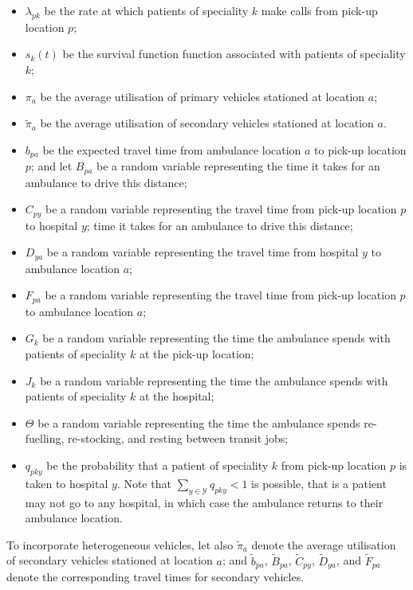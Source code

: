 \documentclass[preprint,12pt]{elsarticle}
\begin{document}
\begin{itemize}
  \item $\lambda_{pk}$ be the rate at which patients of speciality $k$ make
        calls from pick-up location $p$;
  \item $s_k(t)$ be the survival function function associated with patients of
        speciality $k$;
  \item $\pi_a$ be the average utilisation of primary vehicles stationed at
        location $a$;
  \item $\tilde{\pi}_a$ be the average utilisation of secondary vehicles
        stationed at location $a$.
  \item $b_{pa}$ be the expected travel time from ambulance location $a$ to
        pick-up location $p$; and let $B_{pa}$ be a random variable representing
        the time it takes for an ambulance to drive this distance;
  \item $C_{py}$ be a random variable representing the travel time from pick-up
        location $p$ to hospital $y$;
        time it takes for an ambulance to drive this distance;
  \item $D_{ya}$ be a random variable representing the travel time from hospital
        $y$ to ambulance location $a$;
  \item $F_{pa}$ be a random variable representing the travel time from pick-up
        location $p$ to ambulance location $a$;
  \item $G_k$ be a random variable representing the time the ambulance spends
        with patients of speciality $k$ at the pick-up location;
  \item $J_k$ be a random variable representing the time the ambulance spends
        with patients of speciality $k$ at the hospital;
  \item $\Theta$ be a random variable representing the time the ambulance spends
        re-fuelling, re-stocking, and resting between transit jobs;
  \item $q_{pky}$ be the probability that a patient of speciality $k$ from
        pick-up location $p$ is taken to hospital $y$.
        Note that $\sum_{y \in \mathcal{Y}} q_{pky} < 1$ is possible, that is a
        patient may not go to any hospital, in which case the ambulance returns
        to their ambulance location.
\end{itemize}

To incorporate heterogeneous vehicles, let also $\tilde{\pi}_a$ denote the
average utilisation of secondary vehicles stationed at location $a$; and
$\tilde{b}_{pa}$, $\tilde{B}_{pa}$, $\tilde{C}_{py}$, $\tilde{D}_{ya}$, and
$\tilde{F}_{pa}$ denote the corresponding travel times for secondary vehicles.
\end{document}

